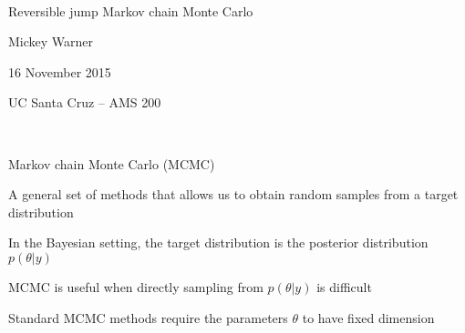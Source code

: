 \documentclass[mathserif, 12pt, t]{beamer}
\newcommand{\m}[1]{#1}
\renewcommand{\frametitle}[1]{\vspace{0.14cm}\hspace{-0.70cm}\textcolor{col2}{%
    \Large{#1}}\vspace{0.15cm}\newline}
\begin{document}
\begin{center}
\ \\ [-0.5in]
\vfill
\bigskip
\bigskip
\bigskip
\bigskip
\bigskip

\begin{Large}
\begin{center}
Reversible jump Markov chain Monte Carlo
\end{center}
\end{Large}
\vfill

Mickey Warner
\vfill

16 November 2015
\smallskip

UC Santa Cruz -- AMS 200

\bigskip
\bigskip
\vfill
\ \\ [-0.5in]
\end{center}



\begin{frame}
\frametitle{Markov chain Monte Carlo (MCMC)}

A general set of methods that allows us to obtain random samples from a target distribution
\bigskip

In the Bayesian setting, the target distribution is the posterior distribution $p(\m{\theta}|\m{y})$
\bigskip

MCMC is useful when directly sampling from $p(\m{\theta}|\m{y})$ is difficult
\bigskip

Standard MCMC methods require the parameters $\m{\theta}$ to have fixed dimension


\end{frame}
\end{document}

